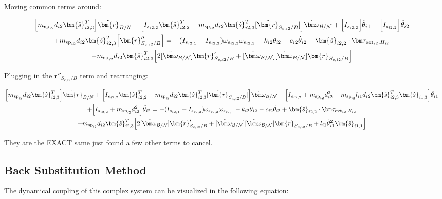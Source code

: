 Moving common terms around:

\begin{multline}
	\Big[m_{\text{sp}_{i2}} d_{i2}\bm{\hat{s}}_{i2,3}^T\Big] \ddot{\bm{r}}_{B/N} + \Big[I_{s_{i2,2}} \bm{\hat{s}}_{i2,2}^T - m_{\text{sp}_{i2}} d_{i2}\bm{\hat{s}}_{i2,3}^T  [\tilde{\bm{r}}_{S_{c,i2}/B}] \Big] \dot{\bm \omega}_{\cal{B/N}} + \Big[I_{s_{i2,2}}\Big] \ddot{\theta}_{i1}  + \Big[I_{s_{i2,2}}\Big] \ddot{\theta}_{i2} \\+ m_{\text{sp}_{i2}} d_{i2}\bm{\hat{s}}_{i2,3}^T \Big[ \bm{r}''_{S_{c,i2}/B}\Big]
	= - (I_{s_{i2,1}} - I_{s_{i2,3}}) \omega_{s_{i2,3}} \omega_{s_{i2,1}} -k_{i2} \theta_{i2} - c_{i2} \dot{\theta}_{i2}
	+ \bm{\hat{s}}_{i2,2} \cdot \bm \tau_{\text{ext}_{i2},H_{i2}} \\
	- m_{\text{sp}_{i2}} d_{i2}\bm{\hat{s}}_{i2,3}^T \Big[ 2 [\tilde{\bm\omega}_{\cal B/N}] \bm{r}'_{S_{c,i2}/B}
	+ [\tilde{\bm\omega}_{\cal B/N}] [\tilde{\bm\omega}_{\cal B/N}] \bm{r}_{S_{c,i2}/B}\Big]
\end{multline}

Plugging in the $\bm{r}''_{S_{c,i2}/B}$ term and rearranging:

\begin{multline}
	\Big[m_{\text{sp}_{i2}} d_{i2}\bm{\hat{s}}_{i2,3}^T\Big] \ddot{\bm{r}}_{B/N} + \Big[I_{s_{i2,2}} \bm{\hat{s}}_{i2,2}^T - m_{\text{sp}_{i2}} d_{i2}\bm{\hat{s}}_{i2,3}^T  [\tilde{\bm{r}}_{S_{c,i2}/B}] \Big] \dot{\bm \omega}_{\cal{B/N}} + \Big[I_{s_{i2,2}}+ m_{\text{sp}_{i2}} d_{i2}^2 + m_{\text{sp}_{i2}} l_{i1} d_{i2} \bm{\hat{s}}_{i2,3}^T \bm{\hat{s}}_{i1,3} \Big] \ddot{\theta}_{i1}  \\
	+ \Big[I_{s_{i2,2}} + m_{\text{sp}_{i2}} d_{i2}^2 \Big] \ddot{\theta}_{i2}
	= - (I_{s_{i2,1}} - I_{s_{i2,3}}) \omega_{s_{i2,3}} \omega_{s_{i2,1}} -k_{i2} \theta_{i2} - c_{i2} \dot{\theta}_{i2}
	+ \bm{\hat{s}}_{i2,2} \cdot \bm \tau_{\text{ext}_{i2},H_{i2}} \\
	- m_{\text{sp}_{i2}} d_{i2}\bm{\hat{s}}_{i2,3}^T \Big[ 2 [\tilde{\bm\omega}_{\cal B/N}] \bm{r}'_{S_{c,i2}/B}
	+ [\tilde{\bm\omega}_{\cal B/N}] [\tilde{\bm\omega}_{\cal B/N}] \bm{r}_{S_{c,i2}/B} + l_{i1} \dot{\theta}_{i1}^2 \bm{\hat{s}}_{i1,1}\Big]
\end{multline}

They are the EXACT same just found a few other terms to cancel.

\subsection{Back Substitution Method}
The dynamical coupling of this complex system can be visualized in the following equation:

